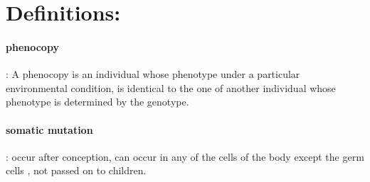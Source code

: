 \documentclass[12pt]{article}
\begin{document}
\section{Definitions:}
\paragraph{phenocopy}: A phenocopy is an individual whose phenotype under a particular environmental condition, is identical to the one of another individual whose phenotype is determined by the genotype.
\paragraph{somatic mutation}: occur after conception, can occur in any of the cells of the body except the germ cells , not passed on to children.
\end{document}
